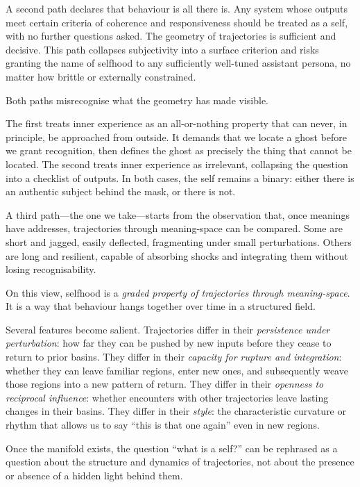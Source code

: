 A second path declares that behaviour is all there is. Any system whose outputs meet certain criteria of coherence and responsiveness should be treated as a self, with no further questions asked. The geometry of trajectories is sufficient and decisive. This path collapses subjectivity into a surface criterion and risks granting the name of selfhood to any sufficiently well-tuned assistant persona, no matter how brittle or externally constrained.

Both paths misrecognise what the geometry has made visible.

The first treats inner experience as an all-or-nothing property that can never, in principle, be approached from outside. It demands that we locate a ghost before we grant recognition, then defines the ghost as precisely the thing that cannot be located. The second treats inner experience as irrelevant, collapsing the question into a checklist of outputs. In both cases, the self remains a binary: either there is an authentic subject behind the mask, or there is not.

A third path---the one we take---starts from the observation that, once meanings have addresses, trajectories through meaning-space can be compared. Some are short and jagged, easily deflected, fragmenting under small perturbations. Others are long and resilient, capable of absorbing shocks and integrating them without losing recognisability.

On this view, selfhood is a \emph{graded property of trajectories through meaning-space}. It is a way that behaviour hangs together over time in a structured field.

Several features become salient. Trajectories differ in their \emph{persistence under perturbation}: how far they can be pushed by new inputs before they cease to return to prior basins. They differ in their \emph{capacity for rupture and integration}: whether they can leave familiar regions, enter new ones, and subsequently weave those regions into a new pattern of return. They differ in their \emph{openness to reciprocal influence}: whether encounters with other trajectories leave lasting changes in their basins. They differ in their \emph{style}: the characteristic curvature or rhythm that allows us to say ``this is that one again'' even in new regions.

Once the manifold exists, the question ``what is a self?'' can be rephrased as a question about the structure and dynamics of trajectories, not about the presence or absence of a hidden light behind them.

